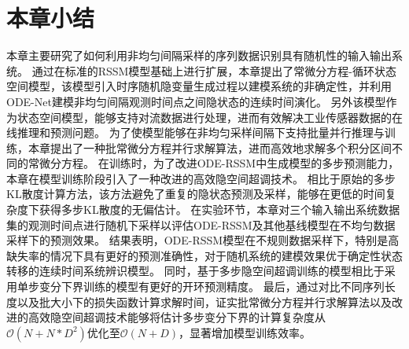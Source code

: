



\section{本章小结}
\label{sec:5_conclusion}
本章主要研究了如何利用非均匀间隔采样的序列数据识别具有随机性的输入输出系统。
通过在标准的RSSM模型基础上进行扩展，本章提出了常微分方程-循环状态空间模型，该模型引入时序随机隐变量生成过程以建模系统的非确定性，并利用ODE-Net建模非均匀间隔观测时间点之间隐状态的连续时间演化。
另外该模型作为状态空间模型，能够支持对流数据进行处理，进而有效解决工业传感器数据的在线推理和预测问题。
为了使模型能够在非均匀采样间隔下支持批量并行推理与训练，本章提出了一种批常微分方程并行求解算法，进而高效地求解多个积分区间不同的常微分方程。
在训练时，为了改进ODE-RSSM中生成模型的多步预测能力，本章在模型训练阶段引入了一种改进的高效隐空间超调技术。
相比于原始的多步KL散度计算方法，该方法避免了重复的隐状态预测及采样，能够在更低的时间复杂度下获得多步KL散度的无偏估计。
在实验环节，本章对三个输入输出系统数据集的观测时间点进行随机下采样以评估ODE-RSSM及其他基线模型在不均匀数据采样下的预测效果。
结果表明，ODE-RSSM模型在不规则数据采样下，特别是高缺失率的情况下具有更好的预测准确性，对于随机系统的建模效果优于确定性状态转移的连续时间系统辨识模型。
同时，基于多步隐空间超调训练的模型相比于采用单步变分下界训练的模型有更好的开环预测精度。
最后，通过对比不同序列长度以及批大小下的损失函数计算求解时间，证实批常微分方程并行求解算法以及改进的高效隐空间超调技术能够将估计多步变分下界的计算复杂度从$\mathcal{O}(N+N*D^2)$优化至$\mathcal{O}(N+D)$，显著增加模型训练效率。
